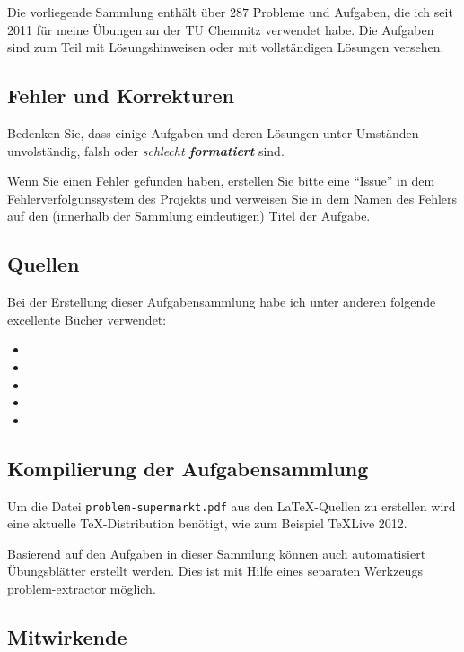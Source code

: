 
Die vorliegende Sammlung enthält über $287$ Probleme und Aufgaben, die ich seit
2011 für meine Übungen an der TU Chemnitz verwendet habe. Die Aufgaben sind zum
Teil mit Lösungshinweisen oder mit vollständigen Lösungen versehen. 

\subsection*{Fehler und Korrekturen}

Bedenken Sie, dass einige Aufgaben und deren Lösungen unter Umständen
unvolständig, falsh oder \emph{schlecht \textbf{formatiert}} sind. 

Wenn Sie einen Fehler gefunden haben, erstellen Sie bitte eine ``Issue'' in dem
Fehlerverfolgunssystem des Projekts und verweisen Sie in dem Namen des Fehlers
auf den (innerhalb der Sammlung eindeutigen) Titel der Aufgabe. 

\subsection*{Quellen}

Bei der Erstellung dieser Aufgabensammlung habe ich unter anderen folgende
excellente Bücher verwendet:

\begin{itemize}
    \item {}
    \item {}
    \item {}
    \item {}
    \item {}
\end{itemize}

\subsection*{Kompilierung der Aufgabensammlung} 

Um die Datei \texttt{problem-supermarkt.pdf} aus den \LaTeX{}-Quellen zu erstellen
wird eine aktuelle \TeX{}-Distribution benötigt, wie zum Beispiel \TeX{}Live 2012. 

Basierend auf den Aufgaben in dieser Sammlung können auch automatisiert 
Übungsblätter erstellt werden. Dies ist mit Hilfe eines separaten Werkzeugs 
\href{https://github.com/jwergieluk/problem-extractor}{problem-extractor}
möglich. 

\subsection*{Mitwirkende}

